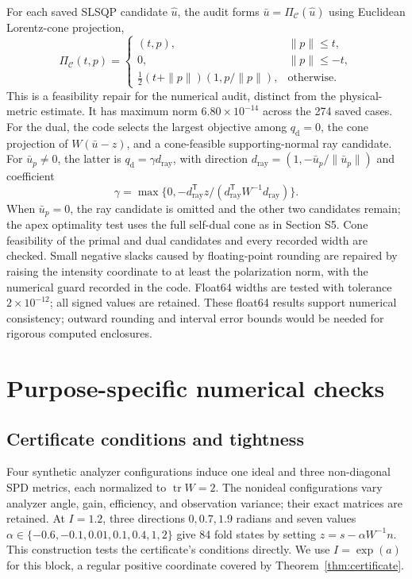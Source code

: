 \documentclass[10pt,a4paper]{article}
\begin{document}
For each saved SLSQP candidate $\widehat u$, the audit forms $\bar u=\Pi_{\mathcal C}(\widehat u)$ using Euclidean Lorentz-cone projection,
\begin{equation}
 \Pi_{\mathcal C}(t,p)=
 \begin{cases}
 (t,p),&\|p\|\leq t,\\
 0,&\|p\|\leq-t,\\
 \tfrac12(t+\|p\|)(1,p/\|p\|),&\text{otherwise}.
 \end{cases}
 \label{eq:euclideancone}
\end{equation}
This is a feasibility repair for the numerical audit, distinct from the physical-metric estimate. It has maximum norm $6.80\times10^{-14}$ across the 274 saved cases. For the dual, the code selects the largest objective among $q_{\mathrm d}=0$, the cone projection of $W(\bar u-z)$, and a cone-feasible supporting-normal ray candidate. For $\bar u_p\ne0$, the latter is $q_{\mathrm d}=\gamma d_{\mathrm{ray}}$, with direction $d_{\mathrm{ray}}=(1,-\bar u_p/\|\bar u_p\|)$ and coefficient
\begin{equation}
 \gamma=\max\{0,-d_{\mathrm{ray}}^{\mathsf T}z/(d_{\mathrm{ray}}^{\mathsf T}W^{-1}d_{\mathrm{ray}})\}.
 \label{eq:dualcandidate}
\end{equation}
When $\bar u_p=0$, the ray candidate is omitted and the other two candidates remain; the apex optimality test uses the full self-dual cone as in Section S5. Cone feasibility of the primal and dual candidates and every recorded width are checked. Small negative slacks caused by floating-point rounding are repaired by raising the intensity coordinate to at least the polarization norm, with the numerical guard recorded in the code. Float64 widths are tested with tolerance $2\times10^{-12}$; all signed values are retained. These float64 results support numerical consistency; outward rounding and interval error bounds would be needed for rigorous computed enclosures.

\section{Purpose-specific numerical checks}
\subsection{Certificate conditions and tightness}
Four synthetic analyzer configurations induce one ideal and three non-diagonal SPD metrics, each normalized to $\operatorname{tr}W=2$. The nonideal configurations vary analyzer angle, gain, efficiency, and observation variance; their exact matrices are retained. At $I=1.2$, three directions $0,0.7,1.9$ radians and seven values $\alpha\in\{-0.6,-0.1,0.01,0.1,0.4,1,2\}$ give 84 fold states by setting $z=s-\alpha W^{-1}n$. This construction tests the certificate's conditions directly. We use $I=\exp(a)$ for this block, a regular positive coordinate covered by Theorem~\ref{thm:certificate}.
\end{document}
